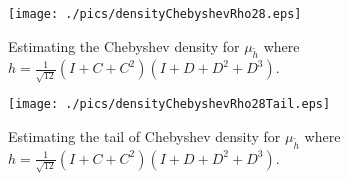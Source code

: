 \documentclass{amsart}
\theoremstyle{definition}
\begin{document}
\begin{figure}
  \texttt{[image: ./pics/densityChebyshevRho28.eps]}\\%
  \caption{Estimating the Chebyshev density for $\mu_{\tilde h}$ where $h=\frac{1}{\sqrt{12}}(I+C+C^2)(I+D+D^2+D^3)$.}\label{f:rho28}
\end{figure}




\begin{figure}
  \texttt{[image: ./pics/densityChebyshevRho28Tail.eps]}\\
  \caption{Estimating the tail of Chebyshev density for $\mu_{\tilde h}$ where  $h=\frac{1}{\sqrt{12}}(I+C+C^2)(I+D+D^2+D^3)$.}\label{f:rho28tails}
\end{figure}









\end{document}

